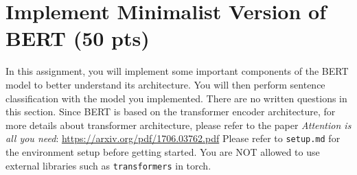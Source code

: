 \documentclass{assignment format}
\begin{document}
\section{Implement Minimalist Version of BERT (50 pts)}
In this assignment, you will implement some important components of the BERT model to better understand its architecture. You will then perform sentence classification with the model you implemented. There are no written questions in this section. Since BERT is based on the transformer encoder architecture, for more details about transformer architecture, please refer to the paper \textit{Attention is all you need}: \url{https://arxiv.org/pdf/1706.03762.pdf} \newline
Please refer to \texttt{setup.md} for the environment setup before getting started. You are NOT allowed to use external libraries such as \texttt{transformers} in torch. 
\end{document}
